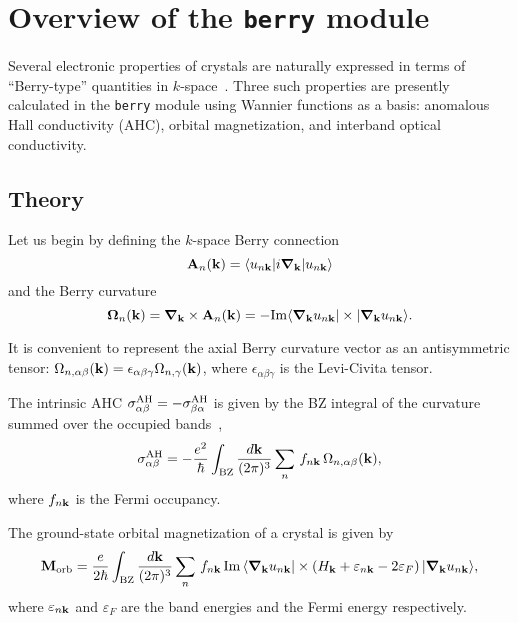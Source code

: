 \chapter{ Overview of the {\tt berry} module}
\label{ch:berry}

Several electronic properties of crystals are naturally expressed in
terms of ``Berry-type'' quantities in $k$-space~\cite{xiao-rmp10}.
Three such properties are presently calculated in the {\tt berry}
module using Wannier functions as a basis: anomalous Hall conductivity
(AHC), orbital magnetization, and interband optical conductivity.

\section{Theory}

Let us begin by defining the $k$-space Berry connection
%
$$
{\bf A}_n({\bf k})=\langle u_{n{\bf k}}\vert i\bm{\nabla}_{\bf k}\vert
u_{n{\bf k}}\rangle
$$
%
and the Berry curvature
%
$$
\bm{\Omega}_n({\bf k})=\bm{\nabla}_{\bf k}\times {\bf A}_n({\bf k})=
-{\rm Im}
\langle \bm{\nabla}_{\bf k} u_{n{\bf k}}\vert \times
\vert\bm{\nabla}_{\bf k} u_{n{\bf k}}\rangle.
$$

It is convenient to represent the axial Berry curvature vector as an
antisymmetric tensor: $ \Omega_{n,\alpha\beta}({\bf k})
=\epsilon_{\alpha\beta\gamma} \Omega_{n,\gamma}({\bf k})$, where
$\epsilon_{\alpha\beta\gamma}$ is the Levi-Civita tensor.

The
intrinsic AHC $\sigma^{\rm AH}_{\alpha\beta}=-\sigma^{\rm
  AH}_{\beta\alpha}$ is given by the BZ integral of the curvature
summed over the occupied bands~\cite{xiao-rmp10},
%
$$
\sigma^{\rm AH}_{\alpha\beta}=-\frac{e^2}{\hbar} \int_{\rm
  BZ}\frac{d{\bf k}}{(2\pi)^3}\sum_n\,f_{n{\bf
    k}}\,\Omega_{n,\alpha\beta}({\bf k}),
$$
%
where $f_{n{\bf k}}$ is the Fermi occupancy.

The ground-state orbital magnetization of a crystal is given
by~\cite{xiao-rmp10,ceresoli-prb06}
%
$$
{\bf M}_{\rm orb}=\frac{e}{2\hbar}\int_{\rm BZ}\frac{d{\bf
    k}}{(2\pi)^3}\sum_n\,f_{n{\bf k}}\,
{\rm Im}\,\langle \bm{\nabla}_{\bf k}u_{n{\bf k}}\vert
\times
\left(H_{\bf k}+\varepsilon_{n{\bf k}}-2\varepsilon_F\right)
\vert \bm{\nabla}_{\bf k}u_{n{\bf k}}\rangle,
$$
%
where $\varepsilon_{n{\bf k}}$ and $\varepsilon_F$ are
the band energies and the Fermi energy respectively.

